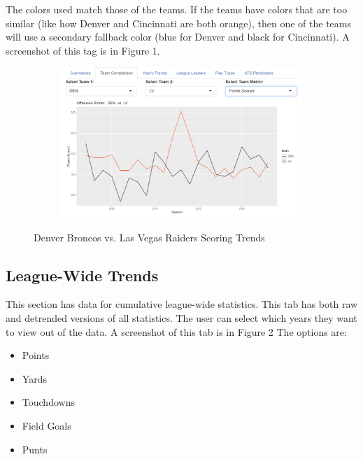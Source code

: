 \documentclass{article}
\begin{document}
The colors used match those of the teams. If the teams have colors
that are too similar (like how Denver and Cincinnati are both orange), 
then one of the teams will use a secondary fallback color
(blue for Denver and black for Cincinnati). A screenshot of this tag is in Figure 1.

\begin{figure}[H]
    \centering
    \begin{subfigure}{0.8\textwidth}
        \centering
        \includegraphics[width=\textwidth]{../screenshots/team-vs-team.png}
    \end{subfigure}\hfill
    \caption{Denver Broncos vs. Las Vegas Raiders Scoring Trends}
\end{figure}

\subsection{League-Wide Trends}

This section has data for cumulative league-wide statistics. This tab has
both raw and detrended versions of all statistics. 
The user can select which years they want to view out of the data.
A screenshot of this tab is in Figure 2 The options are:

\begin{itemize}
    \item Points
    \item Yards
    \item Touchdowns
    \item Field Goals
    \item Punts
\end{itemize}
\end{document}
